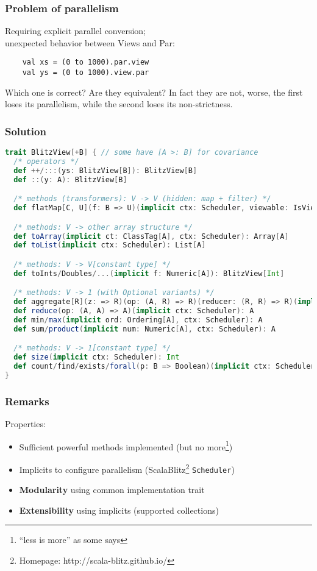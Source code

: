 \documentclass[12pt]{beamer}
\begin{document}
\begin{frame}[fragile]
    \frametitle{Problem of parallelism}
    Requiring explicit parallel conversion; \\
    unexpected behavior between Views and Par:\\

    \begin{lstlisting}
    val xs = (0 to 1000).par.view
    val ys = (0 to 1000).view.par
    \end{lstlisting}

    Which one is correct? Are they equivalent? In fact they are not, worse, the first loses its parallelism, while the second loses its non-strictness.
\end{frame}

\begin{frame}[fragile]
    \frametitle{Solution}
    \begin{lstlisting}[language=scala, basicstyle=\tiny]
trait BlitzView[+B] { // some have [A >: B] for covariance
  /* operators */
  def ++/:::(ys: BlitzView[B]): BlitzView[B]
  def ::(y: A): BlitzView[B]

  /* methods (transformers): V -> V (hidden: map + filter) */
  def flatMap[C, U](f: B => U)(implicit ctx: Scheduler, viewable: IsViewable[U, C]): BlitzView[C]

  /* methods: V -> other array structure */
  def toArray(implicit ct: ClassTag[A], ctx: Scheduler): Array[A]
  def toList(implicit ctx: Scheduler): List[A]

  /* methods: V -> V[constant type] */
  def toInts/Doubles/...(implicit f: Numeric[A]): BlitzView[Int]

  /* methods: V -> 1 (with Optional variants) */
  def aggregate[R](z: => R)(op: (A, R) => R)(reducer: (R, R) => R)(implicit ctx: Scheduler): R
  def reduce(op: (A, A) => A)(implicit ctx: Scheduler): A
  def min/max(implicit ord: Ordering[A], ctx: Scheduler): A
  def sum/product(implicit num: Numeric[A], ctx: Scheduler): A

  /* methods: V -> 1[constant type] */
  def size(implicit ctx: Scheduler): Int
  def count/find/exists/forall(p: B => Boolean)(implicit ctx: Scheduler): Int
}
    \end{lstlisting}
\end{frame}

\begin{frame}
    \frametitle{Remarks}
    Properties:
    \begin{itemize}
        \item Sufficient powerful methods implemented (but no more\footnote{``less is more'' as some says})
        \item Implicits to configure parallelism (ScalaBlitz\footnote{Homepage: http://scala-blitz.github.io/} {\tt Scheduler})
        \item {\bf Modularity} using common implementation trait
        \item {\bf Extensibility} using implicits (supported collections)
    \end{itemize}
\end{frame}
\end{document}
